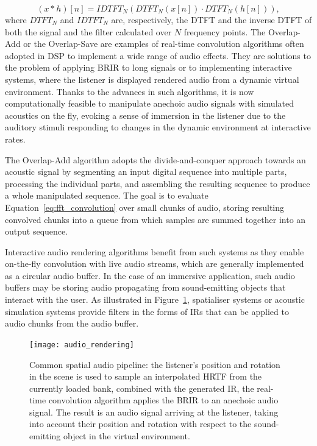 \begin{equation}
    (x * h)[n] = IDTFT_N( DTFT_N(x[n]) \cdot DTFT_N(h[n]) ),
    \label{eq:fft_convolution}
\end{equation}
where $DTFT_N$ and $IDTFT_N$ are, respectively, the DTFT and the inverse DTFT of both the signal and the filter calculated over $N$ frequency points.
The Overlap-Add or the Overlap-Save are examples of real-time convolution algorithms often adopted in DSP to implement a wide range of audio effects. They are solutions to the problem of applying BRIR to long signals or to implementing interactive systems, where the listener is displayed rendered audio from a dynamic virtual environment. Thanks to the advances in such algorithms, it is now computationally feasible to manipulate anechoic audio signals with simulated acoustics on the fly, evoking a sense of immersion in the listener due to the auditory stimuli responding to changes in the dynamic environment at interactive rates. \par
The Overlap-Add algorithm adopts the divide-and-conquer approach towards an acoustic signal by segmenting an input digital sequence into multiple parts, processing the individual parts, and assembling the resulting sequence to produce a whole manipulated sequence. The goal is to evaluate Equation~\ref{eq:fft_convolution} over small chunks of audio, storing resulting convolved chunks into a queue from which samples are summed together into an output sequence. \par
Interactive audio rendering algorithms benefit from such systems as they enable on-the-fly convolution with live audio streams, which are generally implemented as a circular audio buffer. In the case of an immersive application, such audio buffers may be storing audio propagating from sound-emitting objects that interact with the user. As illustrated in Figure~\ref{fig:audio_rendering_chain}, spatialiser systems or acoustic simulation systems provide filters in the forms of IRs that can be applied to audio chunks from the audio buffer.
\begin{figure}
    \centering
    \texttt{[image: audio\_rendering]}
    \caption{Common spatial audio pipeline: the listener's position and rotation in the scene is used to sample an interpolated HRTF from the currently loaded bank, combined with the generated IR, the real-time convolution algorithm applies the BRIR to an anechoic audio signal. The result is an audio signal arriving at the listener, taking into account their position and rotation with respect to the sound-emitting object in the virtual environment.}
    \label{fig:audio_rendering_chain}
\end{figure}

